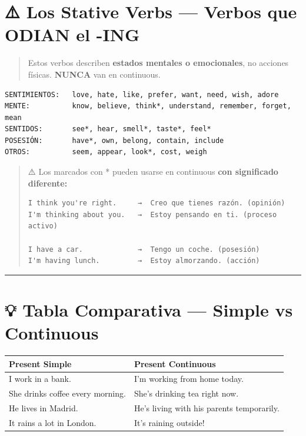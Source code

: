 \documentclass[
  spanish,
  letterpaper,
]{scrbook}
\begin{document}
\section{⚠️ Los Stative Verbs --- Verbos que ODIAN el
-ING}\label{los-stative-verbs-verbos-que-odian-el--ing}

\begin{quote}
Estos verbos describen \textbf{estados mentales o emocionales}, no
acciones físicas. \textbf{NUNCA} van en continuous.
\end{quote}

\begin{verbatim}
SENTIMIENTOS:   love, hate, like, prefer, want, need, wish, adore
MENTE:          know, believe, think*, understand, remember, forget, mean
SENTIDOS:       see*, hear, smell*, taste*, feel*
POSESIÓN:       have*, own, belong, contain, include
OTROS:          seem, appear, look*, cost, weigh
\end{verbatim}

\begin{quote}
⚠️ Los marcados con * pueden usarse en continuous \textbf{con
significado diferente:}

\begin{verbatim}
I think you're right.     →  Creo que tienes razón. (opinión)
I'm thinking about you.   →  Estoy pensando en ti. (proceso activo)

I have a car.             →  Tengo un coche. (posesión)
I'm having lunch.         →  Estoy almorzando. (acción)
\end{verbatim}
\end{quote}

\begin{center}\rule{0.5\linewidth}{0.5pt}\end{center}

\section{💡 Tabla Comparativa --- Simple vs
Continuous}\label{tabla-comparativa-simple-vs-continuous}

\begin{longtable}[]{@{}ll@{}}
\toprule\noalign{}
Present Simple & Present Continuous \\
\midrule\noalign{}
\endhead
\bottomrule\noalign{}
\endlastfoot
I work in a bank. & I'm working from home today. \\
She drinks coffee every morning. & She's drinking tea right now. \\
He lives in Madrid. & He's living with his parents temporarily. \\
It rains a lot in London. & It's raining outside! \\
\end{longtable}
\end{document}
